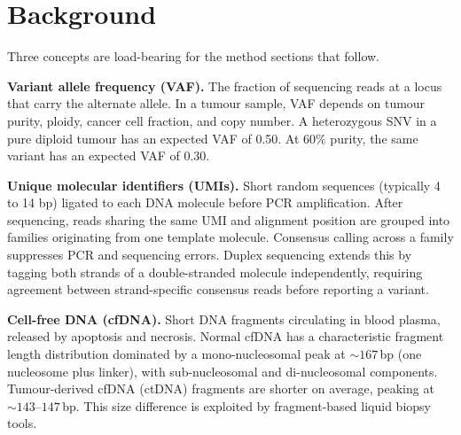 \section{Background}
\label{sec:background}

Three concepts are load-bearing for the method sections that follow.

\textbf{Variant allele frequency (VAF).}
The fraction of sequencing reads at a locus that carry the alternate allele.
In a tumour sample, VAF depends on tumour purity, ploidy, cancer cell fraction, and copy number.
A heterozygous SNV in a pure diploid tumour has an expected VAF of 0.50.
At 60\% purity, the same variant has an expected VAF of 0.30.

\textbf{Unique molecular identifiers (UMIs).}
Short random sequences (typically 4 to 14 bp) ligated to each DNA molecule before PCR amplification.
After sequencing, reads sharing the same UMI and alignment position are grouped into families originating from one template molecule.
Consensus calling across a family suppresses PCR and sequencing errors.
Duplex sequencing extends this by tagging both strands of a double-stranded molecule independently, requiring agreement between strand-specific consensus reads before reporting a variant.

\textbf{Cell-free DNA (cfDNA).}
Short DNA fragments circulating in blood plasma, released by apoptosis and necrosis.
Normal cfDNA has a characteristic fragment length distribution dominated by a mono-nucleosomal peak at ${\sim}167$\,bp (one nucleosome plus linker), with sub-nucleosomal and di-nucleosomal components.
Tumour-derived cfDNA (ctDNA) fragments are shorter on average, peaking at ${\sim}143$--$147$\,bp.
This size difference is exploited by fragment-based liquid biopsy tools.
